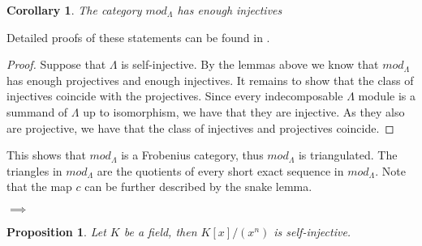 \documentclass[11pt]{article}
\newtheorem{corollary}{Corollary}[theorem]
\newtheorem{prop}[theorem]{Proposition}
\theoremstyle{definition}
\theoremstyle{remark}
\newcommand{\upside}[1]{\rotatebox[origin=c]{180}{#1}}
\begin{document}
            \begin{corollary}
                The category $mod_{\Lambda}$ has enough injectives
            \end{corollary}

            Detailed proofs of these statements can be found in \cite{Rei95}.

            \begin{proof}
                Suppose that $\Lambda$ is self-injective. By the lemmas above we know that $mod_{\Lambda}$ has enough projectives and enough injectives. It remains to show that the class of injectives coincide with the projectives. Since every indecomposable $\Lambda$ module is a summand of $\Lambda$ up to isomorphism, we have that they are injective. As they also are projective, we have that the class of injectives and projectives coincide.
            \end{proof}

            This shows that $mod_{\Lambda}$ is a Frobenius category, thus \underline{$mod_{\Lambda}$} is triangulated. The triangles in \underline{$mod_{\Lambda}$} are the quotients of every short exact sequence in $mod_{\Lambda}$. Note that the map $c$ can be further described by the snake lemma.
            \begin{center}
                $\implies$
            \end{center}



            \begin{prop}
                Let $K$ be a field, then $K[x]/(x^n)$ is self-injective.
            \end{prop}
\end{document}
